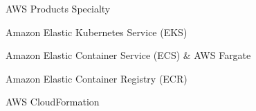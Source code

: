\begin{skills}{AWS Products Specialty}
    \item Amazon Elastic Kubernetes Service (EKS)
    \item Amazon Elastic Container Service (ECS) \& AWS Fargate
    \item Amazon Elastic Container Registry (ECR)
    \item AWS CloudFormation
\end{skills}
